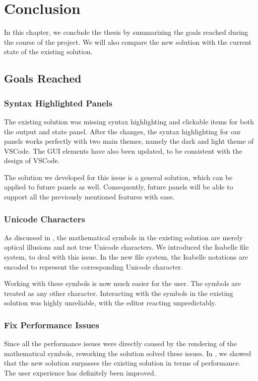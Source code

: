 
\chapter{Conclusion}
\label{chapter:conclusion}
In this chapter, we conclude the thesis by summarizing the goals reached during the course of the project. We will also compare the new solution with the current state of the existing solution. 

\section{Goals Reached}
\label{section:goals}

\subsection{Syntax Highlighted Panels}
The existing solution was missing syntax highlighting and clickable items for both the output and state panel. After the changes, the syntax highlighting for our panels works perfectly with two main themes, namely the dark and light theme of VSCode.  The GUI elements have also been updated, to be consistent with the design of VSCode.

The solution we developed for this issue is a general solution, which can be applied to future panels as well. Consequently, future panels will be able to support all the previously mentioned features with ease.

\subsection{Unicode Characters}
As discussed in , the mathematical symbols in the existing solution are merely optical illusions and not true Unicode characters. We introduced the Isabelle file system, to deal with this issue. In the new file system, the Isabelle notations are encoded to represent the corresponding Unicode character. 

Working with these symbols is now much easier for the user. The symbols are treated as any other character. Interacting with the symbols in the existing solution was highly unreliable, with the editor reacting unpredictably.

\subsection{Fix Performance Issues}
Since all the performance issues were directly caused by the rendering of the mathematical symbols, reworking the solution solved these issues. In , we showed that the new solution surpasses the existing solution in terms of performance. The user experience has definitely been improved.

